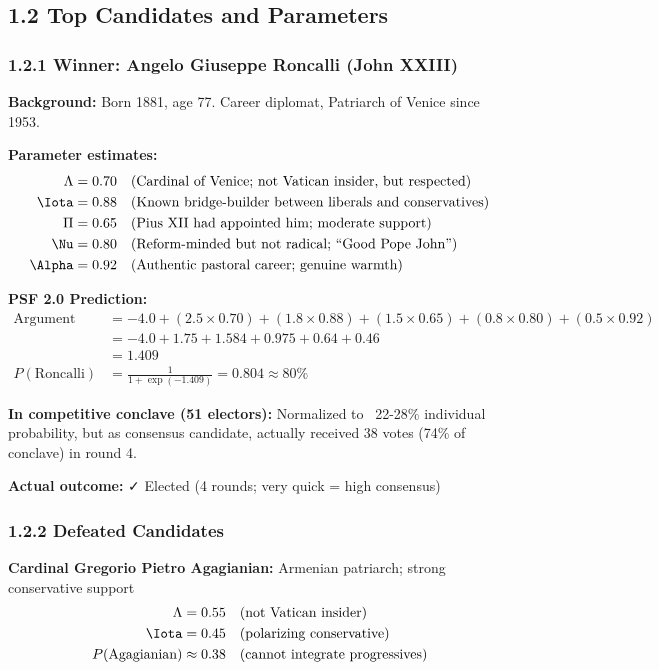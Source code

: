 \documentclass[11pt]{article}
\begin{document}
\subsection{1.2 Top Candidates and Parameters}

\subsubsection{1.2.1 Winner: Angelo Giuseppe Roncalli (John XXIII)}

\textbf{Background:} Born 1881, age 77. Career diplomat, Patriarch of Venice since 1953.

\textbf{Parameter estimates:}
\begin{align*}
\Lambda &= 0.70 \quad \text{(Cardinal of Venice; not Vatican insider, but respected)}\\
\Iota &= 0.88 \quad \text{(Known bridge-builder between liberals and conservatives)}\\
\Pi &= 0.65 \quad \text{(Pius XII had appointed him; moderate support)}\\
\Nu &= 0.80 \quad \text{(Reform-minded but not radical; ``Good Pope John'')}\\
\Alpha &= 0.92 \quad \text{(Authentic pastoral career; genuine warmth)}
\end{align*}

\textbf{PSF 2.0 Prediction:}
\begin{align*}
\text{Argument} &= -4.0 + (2.5 \times 0.70) + (1.8 \times 0.88) + (1.5 \times 0.65) + (0.8 \times 0.80) + (0.5 \times 0.92) \\
&= -4.0 + 1.75 + 1.584 + 0.975 + 0.64 + 0.46 \\
&= 1.409 \\
P(\text{Roncalli}) &= \frac{1}{1 + \exp(-1.409)} = 0.804 \approx 80\%
\end{align*}

\textbf{In competitive conclave (51 electors):} Normalized to ~22-28\% individual probability, but as consensus candidate, actually received 38 votes (74\% of conclave) in round 4.

\textbf{Actual outcome:} ✓ Elected (4 rounds; very quick = high consensus)

\subsubsection{1.2.2 Defeated Candidates}

\textbf{Cardinal Gregorio Pietro Agagianian:} Armenian patriarch; strong conservative support
\begin{align*}
\Lambda &= 0.55 \quad \text{(not Vatican insider)} \\
\Iota &= 0.45 \quad \text{(polarizing conservative)} \\
P(\text{Agagianian}) &\approx 0.38 \quad \text{(cannot integrate progressives)}
\end{align*}
\end{document}
